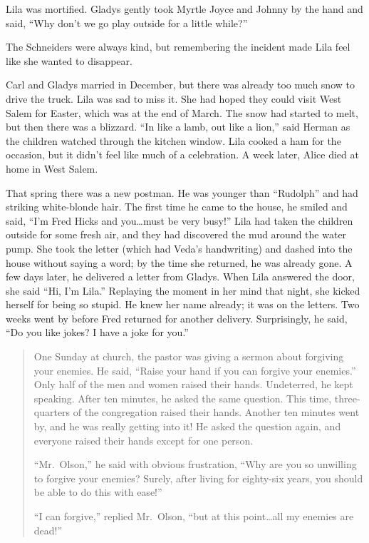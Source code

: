 \documentclass[
  letterpaper,
]{book}
\begin{document}
Lila was mortified. Gladys gently took Myrtle Joyce and Johnny by the
hand and said, ``Why don't we go play outside for a little while?''

The Schneiders were always kind, but remembering the incident made Lila
feel like she wanted to disappear.

Carl and Gladys married in December, but there was already too much snow
to drive the truck. Lila was sad to miss it. She had hoped they could
visit West Salem for Easter, which was at the end of March. The snow had
started to melt, but then there was a blizzard. ``In like a lamb, out
like a lion,'' said Herman as the children watched through the kitchen
window. Lila cooked a ham for the occasion, but it didn't feel like much
of a celebration. A week later, Alice died at home in West Salem.

That spring there was a new postman. He was younger than ``Rudolph'' and
had striking white-blonde hair. The first time he came to the house, he
smiled and said, ``I'm Fred Hicks and you\ldots must be very busy!''
Lila had taken the children outside for some fresh air, and they had
discovered the mud around the water pump. She took the letter (which had
Veda's handwriting) and dashed into the house without saying a word; by
the time she returned, he was already gone. A few days later, he
delivered a letter from Gladys. When Lila answered the door, she said
``Hi, I'm Lila.'' Replaying the moment in her mind that night, she
kicked herself for being so stupid. He knew her name already; it was on
the letters. Two weeks went by before Fred returned for another
delivery. Surprisingly, he said, ``Do you like jokes? I have a joke for
you.''

\begin{quote}
One Sunday at church, the pastor was giving a sermon about forgiving
your enemies. He said, ``Raise your hand if you can forgive your
enemies.'' Only half of the men and women raised their hands.
Undeterred, he kept speaking. After ten minutes, he asked the same
question. This time, three-quarters of the congregation raised their
hands. Another ten minutes went by, and he was really getting into it!
He asked the question again, and everyone raised their hands except for
one person.

``Mr.~Olson,'' he said with obvious frustration, ``Why are you so
unwilling to forgive your enemies? Surely, after living for eighty-six
years, you should be able to do this with ease!''

``I can forgive,'' replied Mr.~Olson, ``but at this point\ldots all my
enemies are dead!''
\end{quote}
\end{document}
